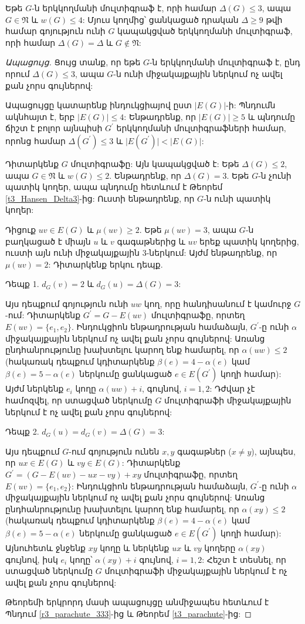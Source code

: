 \begin{theorem}
\label{t3_bipartite_multi_Delta3} Եթե $G$-ն երկկողմանի մուլտիգրաֆ է, որի համար
$\Delta(G)\leq 3$, ապա $G\in \mathfrak{N}$ և $w(G)\leq 4$: Մյուս կողմից՝ ցանկացած դրական $\Delta \geq 9$ թվի համար գոյություն ունի $G$ կապակցված երկկողմանի մուլտիգրաֆ, որի համար $\Delta(G)=\Delta$ և $G\notin \mathfrak{N}$:
\end{theorem}
\begin{proof}[Ապացույց] Ցույց տանք, որ եթե $G$-ն երկկողմանի մուլտիգրաֆ է, ընդ որում $\Delta(G)\leq 3$, ապա
$G$-ն ունի միջակայքային ներկում ոչ ավել քան չորս գույներով:

Ապացույցը կատարենք ինդուկցիայով ըստ $\vert E(G)\vert$-ի: Պնդումն ակնհայտ է, երբ $\vert E(G)\vert\leq 4$:
Ենթադրենք, որ $\vert E(G)\vert\geq 5$ և պնդումը ճիշտ է բոլոր այնպիսի $G^{\prime}$ երկկողմանի մուլտիգրաֆների համար, 
որոնց համար $\Delta(G^{\prime})\leq 3$ և $\vert
E(G^{\prime})\vert<\vert E(G)\vert$:

Դիտարկենք $G$ մուլտիգրաֆը: Այն կապակցված է: Եթե
$\Delta(G)\leq 2$, ապա $G\in \mathfrak{N}$ և $w(G)\leq 2$. Ենթադրենք, որ $\Delta(G)=3$. Եթե $G$-ն չունի պատիկ կողեր, ապա պնդումը հետևում է Թեորեմ \ref{t3_Hansen_Delta3}-ից: Ուստի ենթադրենք, որ $G$-ն ունի պատիկ կողեր:

Դիցուք $uv\in E(G)$ և $\mu(uv)\geq 2$. Եթե $\mu(uv)= 3$, ապա $G$-ն բաղկացած է միայն $u$ և $v$ գագաթներից և $uv$ երեք պատիկ կողերից, ուստի այն ունի միջակայքային $3$-ներկում: Այժմ ենթադրենք, որ $\mu(uv)= 2$: Դիտարկենք երկու դեպք.

Դեպք 1. $d_{G}(v)=2$ և $d_{G}(u)=\Delta(G)=3$:

Այս դեպքում գոյություն ունի $uw$ կող, որը հանդիսանում է կամուրջ
$G$-ում: Դիտարկենք $G^{\prime}=G-E(uv)$ մուլտիգրաֆը, որտեղ
$E(uv)=\{e_{1},e_{2}\}$. Ինդուկցիոն ենթադրության համաձայն, $G^{\prime}$-ը ունի $\alpha$ միջակայքային ներկում ոչ ավել քան չորս գույներով:
Առանց ընդհանրությունը խախտելու կարող ենք համարել, որ $\alpha (uw)\leq 2$ (հակառակ դեպքում կդիտարկենք $\beta(e)=4-\alpha(e)$ կամ
$\beta(e)=5-\alpha(e)$ ներկումը ցանկացած $e\in E(G^{\prime})$ կողի համար): Այժմ ներկենք $e_{i}$ կողը $\alpha (uw)+i$, գույնով, $i=1,2$: Դժվար չէ համոզվել, որ ստացված ներկումը $G$ մուլտիգրաֆի միջակայքային ներկում է ոչ ավել քան չորս գույներով:

Դեպք 2. $d_{G}(u)=d_{G}(v)=\Delta(G)=3$:

Այս դեպքում $G$-ում գոյություն ունեն $x,y$ գագաթներ ($x\neq y$), այնպես, որ $ux\in E(G)$ և $vy\in E(G)$: Դիտարկենք $G^{\prime}=(G-E(uv)-ux-vy)+xy$ մուլտիգրաֆը, որտեղ $E(uv)=\{e_{1},e_{2}\}$: Ինդուկցիոն ենթադրության համաձայն, $G^{\prime}$-ը ունի $\alpha$ միջակայքային ներկում ոչ ավել քան չորս գույներով:
Առանց ընդհանրությունը խախտելու կարող ենք համարել, որ $\alpha (xy)\leq 2$ (հակառակ դեպքում կդիտարկենք $\beta(e)=4-\alpha(e)$ կամ
$\beta(e)=5-\alpha(e)$ ներկումը ցանկացած $e\in E(G^{\prime})$ կողի համար): Այնուհետև ջնջենք $xy$ կողը և ներկենք $ux$ և $vy$ կողերը
$\alpha (xy)$ գույնով, իսկ $e_{i}$ կողը՝ $\alpha (xy)+i$ գույնով,
$i=1,2$: Հեշտ է տեսնել, որ ստացված ներկումը $G$ մուլտիգրաֆի միջակայքային ներկում է ոչ ավել քան չորս գույներով:

Թեորեմի երկրորդ մասի ապացույցը անմիջապես հետևում է Պնդում \ref{r3_parachute_333}-ից և Թեորեմ \ref{t3_parachute}-ից:
\end{proof}